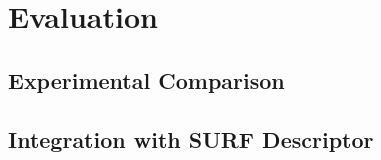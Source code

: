 \section{Evaluation}
\label{sec:evaluation}

\subsection{Experimental Comparison}
\label{sec:evaluation_comparison}

\subsection{Integration with SURF Descriptor}
\label{sec:observaion_integration}
